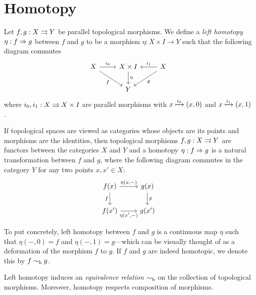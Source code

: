 \section{Homotopy}

\begin{definition}
    \label{def:left-homotopy-Top}
    Let \(f, g: X \rightrightarrows Y\) be parallel topological morphisms. We define a
    \emph{left homotopy} \(\eta: f \Rightarrow g\) between \(f\) and \(g\) to be a morphism
    \(\eta: X \times I \to Y\) such that the following diagram commutes
    \[
        \begin{tikzcd}
            X \ar[d, rd, "f"'] \ar[r, "i_0"]
            & X \times I \ar[d, "\eta"]
            & X \ar[l, "i_1"'] \ar[ld, "g"]
            \\
            & Y
        \end{tikzcd}
    \]
    where \(i_0, i_1: X \rightrightarrows X \times I\) are parallel morphisms with \(x
    \xmapsto{i_{0}} (x, 0)\) and \(x \xmapsto{i_{1}} (x, 1)\).

    If topological spaces are viewed as categories whose objects are its points and
    morphisms are the identities, then topological morphisms \(f, g: X \rightrightarrows Y\) are
    functors between the categories \(X\) and \(Y\) and a homotopy \(\eta: f \Rightarrow g\)
    is a natural transformation between \(f\) and \(g\), where the following diagram
    commutes in the category \(Y\) for any two points \(x, x' \in X\):
    \[
        \begin{tikzcd}
            {f(x)}  \ar[r, "{\eta(x, -)}"] \ar[d, "f"'] &{g(x)} \ar[d, "g"] \\
            {f(x')} \ar[r, "\eta{(x', -)}"'] &{g(x')}
        \end{tikzcd}
    \]
\end{definition}

To put concretely, left homotopy between \(f\) and \(g\) is a continuous map
\(\eta\) such that \(\eta(-, 0) = f\) and \(\eta(-, 1) = g\)---which can be
visually thought of as a deformation of the morphism \(f\) to \(g\). If \(f\)
and \(g\) are indeed homotopic, we denote this by \(f \sim_{\text{h}} g\).

\begin{corollary}
    \label{cor:htpy-equivalence-rel}
    Left homotopy induces an \emph{equivalence relation} \(\sim_{\text{h}}\) on the
    collection of topological morphisms. Moreover, homotopy respects composition of
    morphisms.
\end{corollary}

